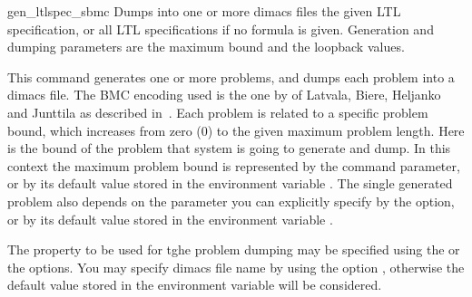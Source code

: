 \begin{nusmvCommand} {gen\_ltlspec\_sbmc} {\label{genLtlspecSbmc} 
Dumps into one or more dimacs files the given LTL specification, or
all LTL specifications if no formula is given. Generation and dumping
parameters are the maximum bound and the loopback values.}


This command generates one or more problems, and dumps each problem
into a dimacs file. The BMC encoding used is the one by of Latvala,
Biere, Heljanko and Junttila as described in~\cite{vmcai05}.
%
Each problem is related to a specific problem bound, which
increases from zero ($0$) to the given maximum problem length. Here
 is the bound of the problem that system is going to
generate and dump.  In this context the maximum problem bound is
represented by the  command parameter, or by its default
value stored in the environment variable .  The
single generated problem also depends on the  parameter
you can explicitly specify by the  option, or by its
default value stored in the environment variable
.

The property to be used for tghe problem dumping may be specified
using the  or the  options.
You may specify dimacs file name by using the option , otherwise the default value stored in the environment
variable  will be considered.

\begin{cmdOpt}

       
            


\end{cmdOpt}
\end{nusmvCommand}
